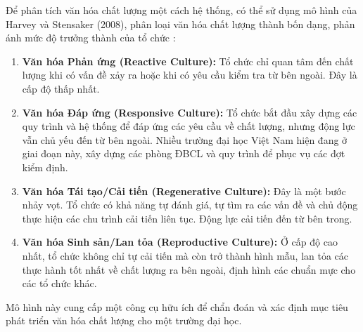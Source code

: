 \documentclass[12pt, a4paper, openany]{report}
\begin{document}
Để phân tích văn hóa chất lượng một cách hệ thống, có thể sử dụng mô hình của Harvey và Stensaker (2008), phân loại văn hóa chất lượng thành bốn dạng, phản ánh mức độ trưởng thành của tổ chức \cite{HarveyStensaker}:
\begin{enumerate}
    \item \textbf{Văn hóa Phản ứng (Reactive Culture):} Tổ chức chỉ quan tâm đến chất lượng khi có vấn đề xảy ra hoặc khi có yêu cầu kiểm tra từ bên ngoài. Đây là cấp độ thấp nhất.
    \item \textbf{Văn hóa Đáp ứng (Responsive Culture):} Tổ chức bắt đầu xây dựng các quy trình và hệ thống để đáp ứng các yêu cầu về chất lượng, nhưng động lực vẫn chủ yếu đến từ bên ngoài. Nhiều trường đại học Việt Nam hiện đang ở giai đoạn này, xây dựng các phòng ĐBCL và quy trình để phục vụ các đợt kiểm định.
    \item \textbf{Văn hóa Tái tạo/Cải tiến (Regenerative Culture):} Đây là một bước nhảy vọt. Tổ chức có khả năng tự đánh giá, tự tìm ra các vấn đề và chủ động thực hiện các chu trình cải tiến liên tục. Động lực cải tiến đến từ bên trong.
    \item \textbf{Văn hóa Sinh sản/Lan tỏa (Reproductive Culture):} Ở cấp độ cao nhất, tổ chức không chỉ tự cải tiến mà còn trở thành hình mẫu, lan tỏa các thực hành tốt nhất về chất lượng ra bên ngoài, định hình các chuẩn mực cho các tổ chức khác.
\end{enumerate}
Mô hình này cung cấp một công cụ hữu ích để chẩn đoán và xác định mục tiêu phát triển văn hóa chất lượng cho một trường đại học.
\end{document}
